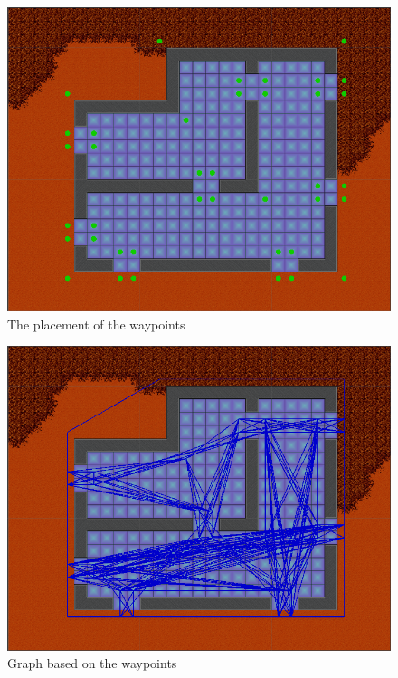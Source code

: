 \begin{figure}
	\includegraphics[width=\textwidth]{figures/astar/waypoints}
	\caption{The placement of the waypoints}
	\label{waypointsNode}
\end{figure}

\begin{figure}
	\includegraphics[width=\textwidth]{figures/astar/waypointsGraph}
	\caption{Graph based on the waypoints}
	\label{waypointgraph}
\end{figure}
